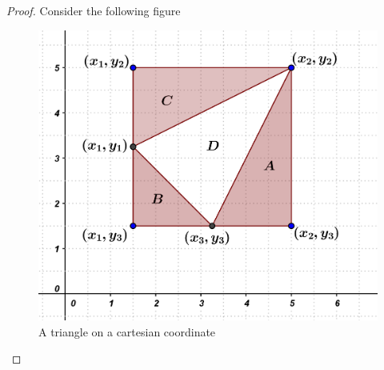 \documentclass[12pt]{article}
\theoremstyle{definition}
\begin{document}
\begin{proof}
Consider the following figure
\begin{figure}[hbt!]
\centering
\includegraphics[width=.5\textwidth]{matarea.png}
\caption{A triangle on a cartesian coordinate}
\end{figure}


\end{proof}
\end{document}
